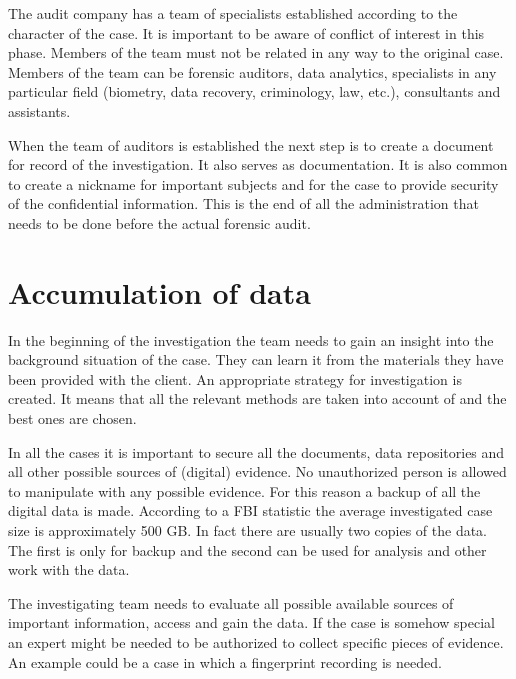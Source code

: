 The audit company has a team of specialists established according to the character of the case. It is important to be aware of conflict of interest in this phase. Members of the team must not be related in any way to the original case. Members of the team can be forensic auditors, data analytics, specialists in any particular field (biometry, data recovery, criminology, law, etc.), consultants and assistants. 

When the team of auditors is established the next step is to create a document for record of the investigation. It also serves as documentation. It is also common to create a nickname for important subjects and for the case to provide security of the confidential information. This is the end of all the administration that needs to be done before the actual forensic audit. 

\section{Accumulation of data}
In the beginning of the investigation the team needs to gain an insight into the background situation of the case. They can learn it from the materials they have been provided with the client. An appropriate strategy for investigation is created. It means that all the relevant methods are taken into account of and the best ones are chosen. 

In all the cases it is important to secure all the documents, data repositories and all other possible sources of (digital) evidence. No unauthorized person is allowed to manipulate with any possible evidence. For this reason a backup of all the digital data is made. According to a FBI statistic the average investigated case size is approximately 500 GB.  In fact there are usually two copies of the data. The first is only for backup and the second can be used for analysis and other work with the data. 

The investigating team needs to evaluate all possible available sources of important information, access and gain the data. If the case is somehow special an expert might be needed to be authorized to collect specific pieces of evidence. An example could be a case in which a fingerprint recording is needed. 

